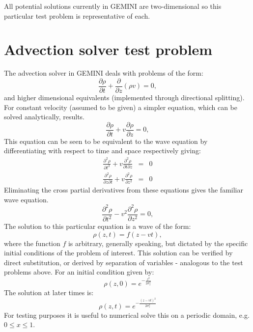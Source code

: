 \documentclass[11pt,letterpaper]{article}
\begin{document}
All potential solutions currently in GEMINI are two-dimensional so this particular test problem is representative of each.  


\section{Advection solver test problem}

The advection solver in GEMINI deals with problems of the form:
\begin{equation}
\frac{\partial \rho}{\partial t} + \frac{\partial}{\partial z} \left( \rho v \right) = 0,  
\end{equation}
and higher dimensional equivalents (implemented through directional splitting).  For constant velocity (assumed to be given) a simpler equation, which can be solved analytically, results.  
\begin{equation}
\frac{\partial \rho}{\partial t} + v \frac{\partial \rho}{\partial z} = 0,  
\end{equation}
This equation can be seen to be equivalent to the wave equation by differentiating with respect to time and space respectively giving:  
\begin{eqnarray}
\frac{\partial^2 \rho}{\partial t^2} + v \frac{\partial^2 \rho}{\partial t \partial z} &=& 0 \\
\frac{\partial^2 \rho}{\partial z \partial t} + v \frac{\partial^2 \rho}{\partial z^2} &=& 0
\end{eqnarray}
Eliminating the cross partial derivatives from these equations gives the familiar wave equation.  
\begin{equation}
\frac{\partial^2 \rho}{\partial t^2} - v^2 \frac{\partial^2 \rho}{\partial z^2} = 0,  
\end{equation}
The solution to this particular equation is a wave of the form:
\begin{equation}
\rho(z,t)=f(z-vt),
\end{equation}
where the function $f$ is arbitrary, generally speaking, but dictated by the specific initial conditions of the problem of interest.  This solution can be verified by direct substitution, or derived by separation of variables - analogous to the test problems above.  For an initial condition given by:
\begin{equation}
\rho(z,0)=e^{-\frac{z^2}{2 \sigma_z^2}}
\end{equation}
The solution at later times is:
\begin{equation}
\rho(z,t)=e^{-\frac{(z-vt)^2}{2 \sigma_z^2}}
\end{equation}
For testing purposes it is useful to numerical solve this on a periodic domain, e.g. $0 \le x \le 1$.
\end{document}
